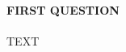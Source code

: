 \documentclass[10pt]{article}
\begin{document}
\maketitle


\paragraph{FIRST QUESTION}
TEXT
\end{document}
